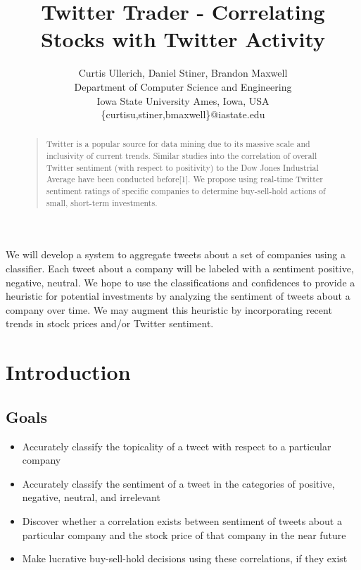 \documentclass[letterpaper]{article}
\begin{document}
\title{Twitter Trader - Correlating \\ Stocks with Twitter Activity}
\author{
Curtis Ullerich, Daniel Stiner, Brandon Maxwell\\
Department of Computer Science and Engineering\\
Iowa State University
Ames, Iowa, USA\\
\{curtisu,stiner,bmaxwell\}@iastate.edu\\
}
\maketitle
\begin{abstract}
\begin{quote}
Twitter is a popular source for data mining due to its massive scale and inclusivity of current trends. Similar studies into the correlation of overall Twitter sentiment (with respect to positivity) to the Dow Jones Industrial Average have been conducted before[1]. We propose using real-time Twitter sentiment ratings of specific companies to determine buy-sell-hold actions of small, short-term investments.
\end{quote}
\end{abstract}

\noindent We will develop a system to aggregate tweets about a set of companies using a classifier. Each tweet about a company will be labeled with a sentiment {positive, negative, neutral}. We hope to use the classifications and confidences to provide a heuristic for potential investments by analyzing the sentiment of tweets about a company over time. We may augment this heuristic by incorporating recent trends in stock prices and/or Twitter sentiment.

\section{Introduction}

\subsection{Goals}

\begin{itemize}

\item Accurately classify the topicality of a tweet with respect to a particular company
\item Accurately classify the sentiment of a tweet in the categories of positive, negative, neutral, and irrelevant
\item Discover whether a correlation exists between sentiment of tweets about a particular company and the stock price of that company in the near future
\item Make lucrative buy-sell-hold decisions using these correlations, if they exist

\end{itemize}
\end{document}
